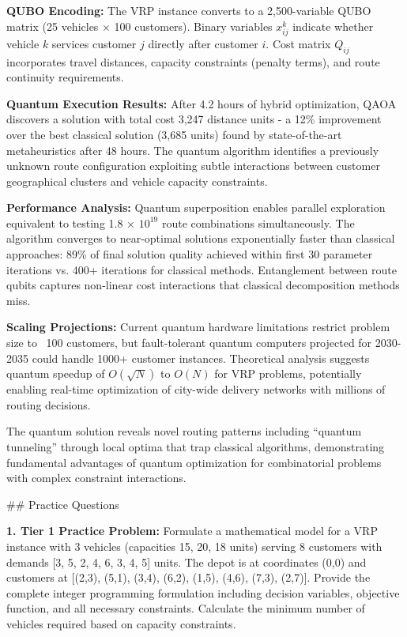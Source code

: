 \documentclass{article}
\begin{document}
\textbf{QUBO Encoding:} The VRP instance converts to a 2,500-variable QUBO matrix (25 vehicles × 100 customers). Binary variables $x_{ij}^k$ indicate whether vehicle $k$ services customer $j$ directly after customer $i$. Cost matrix $Q_{ij}$ incorporates travel distances, capacity constraints (penalty terms), and route continuity requirements.

\textbf{Quantum Execution Results:} After 4.2 hours of hybrid optimization, QAOA discovers a solution with total cost 3,247 distance units - a 12\% improvement over the best classical solution (3,685 units) found by state-of-the-art metaheuristics after 48 hours. The quantum algorithm identifies a previously unknown route configuration exploiting subtle interactions between customer geographical clusters and vehicle capacity constraints.

\textbf{Performance Analysis:} Quantum superposition enables parallel exploration equivalent to testing 1.8 × $10^{19}$ route combinations simultaneously. The algorithm converges to near-optimal solutions exponentially faster than classical approaches: 89\% of final solution quality achieved within first 30 parameter iterations vs. 400+ iterations for classical methods. Entanglement between route qubits captures non-linear cost interactions that classical decomposition methods miss.

\textbf{Scaling Projections:} Current quantum hardware limitations restrict problem size to ~100 customers, but fault-tolerant quantum computers projected for 2030-2035 could handle 1000+ customer instances. Theoretical analysis suggests quantum speedup of $O(\sqrt{N})$ to $O(N)$ for VRP problems, potentially enabling real-time optimization of city-wide delivery networks with millions of routing decisions.

The quantum solution reveals novel routing patterns including ``quantum tunneling'' through local optima that trap classical algorithms, demonstrating fundamental advantages of quantum optimization for combinatorial problems with complex constraint interactions.

## Practice Questions

\textbf{1. Tier 1 Practice Problem:} Formulate a mathematical model for a VRP instance with 3 vehicles (capacities 15, 20, 18 units) serving 8 customers with demands [3, 5, 2, 4, 6, 3, 4, 5] units. The depot is at coordinates (0,0) and customers at [(2,3), (5,1), (3,4), (6,2), (1,5), (4,6), (7,3), (2,7)]. Provide the complete integer programming formulation including decision variables, objective function, and all necessary constraints. Calculate the minimum number of vehicles required based on capacity constraints.
\end{document}
